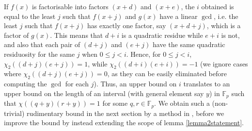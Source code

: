 \documentclass{report}
\begin{document}
If $f(x)$ is factorisable into factors $(x+d)$ and $(x+e)$, the $i$ obtained is equal to the least $j$ such that $f(x+j)$ and $g(x)$ have a linear $\gcd$, i.e. the least $j$ such that $f(x+j)$ has exactly one factor, say $(x+d+j)$, which is a factor of  $g(x)$. This means that $d+i$ is a quadratic residue while $e+i$ is not, and also that each pair of $(d+j)$ and $(e+j)$ have the same quadratic residuosity for the same $j$ when $0\leq j<i$. Hence, for $0\leq j<i$, $\chi_2((d+j)(e+j))=1$, while $\chi_2((d+i)(e+i))=-1$ (we ignore cases where $\chi_2((d+j)(e+j))=0$, as they can be easily eliminated before computing the $\gcd$ for each $j$). Thus, an upper bound on $i$ translates to an upper bound on the length of an interval (with general element say $y$) in $\mathbb{F}_p$ such that $\chi((q+y)(r+y))=1$ for some $q,r\in \mathbb{F}_p$. We obtain such a (non-trivial) rudimentary bound in the next section by a method in \cite{shoup}, before we improve the bound by instead extending the scope of lemma \ref{lemma2statement}.
%
%
\end{document}
